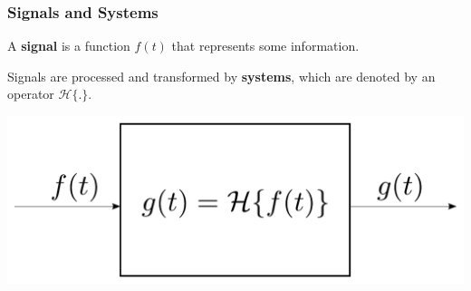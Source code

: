 
\begin{frame}
    \frametitle{Signals and Systems}
    \begin{myDefinition}
        A \textbf{signal} is a function $f(t)$ that represents some information.

        \vspace{5mm}

        Signals are processed and transformed by \textbf{systems}, which are denoted by an operator $\mathcal{H}\{.\}$.
    \end{myDefinition}
    \begin{center}
        \includegraphics[height=.30\textheight ]{images/SystemBlock.pdf}
    \end{center}

\end{frame}


